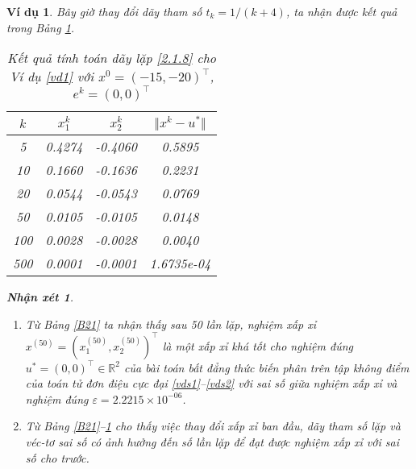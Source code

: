 \documentclass[14pt, oneside,A4paper]{book}
\theoremstyle{plain}
\newtheorem{vd}[theorem]{\bf Ví dụ}
\newtheorem{nx}[theorem]{\bf Nhận xét}
\begin{document}
\begin{vd}
Bây giờ thay đổi dãy tham số  $t_k = 1/(k+4)$, ta nhận được kết quả trong Bảng \ref{B25}.
\begin{table}[ht!]
	\centering
	\begin{tabular}{|c|c|c|c|}
		\hline 
		$k$ & $x_1^k$ & $x_2^k$ & $\Vert x^ {k}- u^{*} \Vert$\\ 
		\hline 
		5 & 0.4274 & -0.4060 & 0.5895 \\ 
		\hline 
		10 & 0.1660 & -0.1636 & 0.2231 \\ 
		\hline 
		20 & 0.0544 & -0.0543 & 0.0769\\ 
		\hline 
		50 & 0.0105 & -0.0105 & 0.0148 \\ 
		\hline 
		100 & 0.0028 & -0.0028 & 0.0040\\ 
		\hline 
		500 & 0.0001 & -0.0001 & 1.6735e-04\\ 
		\hline 
	\end{tabular}
	\caption{Kết quả tính toán dãy lặp \eqref{2.1.8} cho Ví dụ \ref{vd1} với $x^{0}= (-15, -20)^{\top} $, $e^{k}=(0,0)^\top$}
	\label{B25}
\end{table}


\begin{nx}\rm \begin{enumerate}
		\item Từ Bảng \ref{B21} ta nhận thấy sau 50 lần lặp, nghiệm xấp xỉ $x^{(50)}=(x^{(50)}_1,x^{(50)}_2)^\top $ là một xấp xỉ khá tốt cho nghiệm đúng $u^{*}=(0,0)^\top\in \mathbb R^2$ của bài toán bất đẳng thức biến phân trên tập không điểm của toán tử đơn điệu cực đại \eqref{vds1}--\eqref{vds2} với sai số giữa nghiệm xấp xỉ và nghiệm đúng $\varepsilon = 2.2215 \times 10^{-06}$.
		\item Từ Bảng \ref{B21}--\ref{B25}  cho thấy việc thay đổi xấp xỉ ban đầu, dãy tham số lặp và véc-tơ sai số có ảnh hưởng đến số lần lặp để đạt được nghiệm xấp xỉ với sai số cho trước.
	\end{enumerate}
\end{nx} 






\end{vd}
\end{document}
